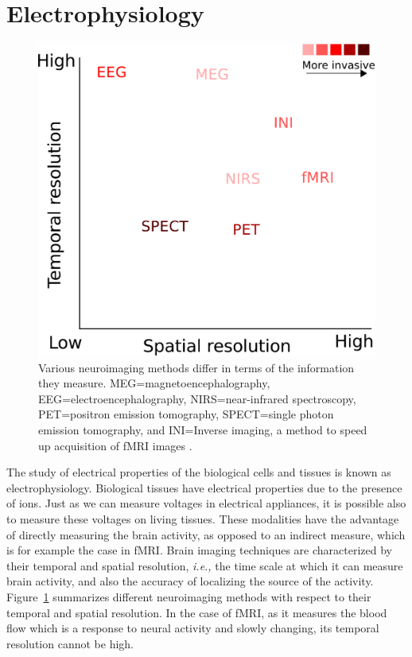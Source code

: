 
\clearpage

\section{Electrophysiology}

\begin{figure}[htb]
\begin{center}
   \includegraphics[width=0.4\linewidth]{figures/neuroimaging_methods.pdf}
\end{center}
   \caption[Various neuroimaging methods differ in terms of the information they measure.]{Various neuroimaging methods differ in terms of the information they measure. MEG=magnetoencephalography, EEG=electroencephalography, NIRS=near-infrared spectroscopy, PET=positron emission tomography, SPECT=single photon emission tomography, and INI=Inverse imaging, a method to speed up acquisition of fMRI images .}
   \label{fig:neuroimaging_methods}
\end{figure}

The study of electrical properties of the biological cells and tissues is known as electrophysiology. Biological tissues have electrical properties due to the presence of ions. Just as we can measure voltages in electrical appliances, it is possible also to measure these voltages on living tissues. These modalities have the advantage of directly measuring the brain activity, as opposed to an indirect measure, which is for example the case in \ac{fMRI}.
Brain imaging techniques are characterized by their temporal and spatial resolution, \textit{i.e.,} the time scale at which it can measure brain activity, and also the accuracy of localizing the source of the activity. Figure~\ref{fig:neuroimaging_methods} summarizes different neuroimaging methods with respect to their temporal and spatial resolution. In the case of \ac{fMRI}, as it measures the blood flow which is a response to neural activity and slowly changing, its temporal resolution cannot be high. 

